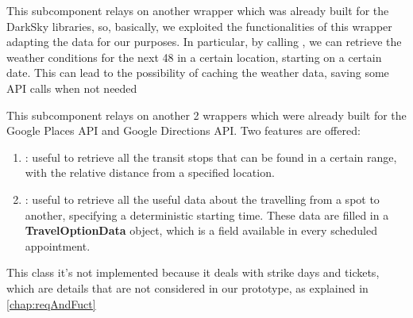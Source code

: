 This subcomponent relays on another wrapper which was already built for the DarkSky libraries, so, basically, we exploited the functionalities of this wrapper adapting the data for our purposes. In particular, by calling , we can retrieve the weather conditions for the next 48 in a certain location, starting on a certain date. This can lead to the possibility of caching the weather data, saving some API calls when not needed

This subcomponent relays on another 2 wrappers which were already built for the Google Places API and Google Directions API. Two features are offered:

\begin{enumerate}
\item {}: useful to retrieve all the transit stops that can be found in a certain range, with the relative distance from a specified location.
\item {}: useful to retrieve all the useful data about the travelling from a spot to another, specifying a deterministic starting time. These data are filled in a \textbf{TravelOptionData} object, which is a field available in every scheduled appointment.
\end{enumerate}

This class it's not implemented because it deals with strike days and tickets, which are details that are not considered in our prototype, as explained in \ref{chap:reqAndFuct}

